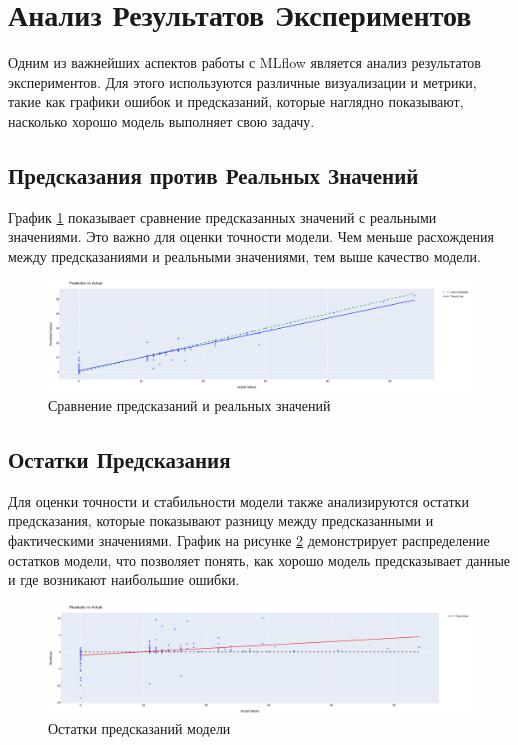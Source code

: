 \documentclass[14pt, a4paper]{bsu}
\begin{document}
\section{Анализ Результатов Экспериментов}

Одним из важнейших аспектов работы с MLflow является анализ
результатов экспериментов. Для этого используются различные
визуализации и метрики, такие как графики ошибок и предсказаний,
которые наглядно показывают, насколько хорошо модель выполняет свою
задачу.

\subsection{Предсказания против Реальных Значений}

График \ref{fig:prediction_vs_actual} показывает сравнение
предсказанных значений с реальными значениями. Это важно для оценки
точности модели. Чем меньше расхождения между предсказаниями и
реальными значениями, тем выше качество модели.

\begin{figure}[h!] \centering
	\includegraphics[width=1.0\textwidth]{prediction_vs_actual_example.png}
	\caption{Сравнение предсказаний и реальных значений}
	\label{fig:prediction_vs_actual} \end{figure}

\subsection{Остатки Предсказания}

Для оценки точности и стабильности модели также анализируются
остатки предсказания, которые показывают разницу между
предсказанными и фактическими значениями. График на рисунке
\ref{fig:residuals} демонстрирует распределение остатков модели,
что позволяет понять, как хорошо модель предсказывает данные и где
возникают наибольшие ошибки.

\begin{figure}[h!] \centering
	\includegraphics[width=1.0\textwidth]{residuals_example.png}
	\caption{Остатки предсказаний модели} \label{fig:residuals}
\end{figure}
\end{document}
